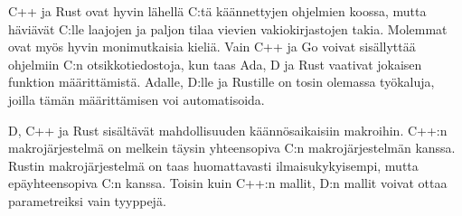 C++ ja Rust ovat hyvin lähellä C:tä käännettyjen ohjelmien koossa, mutta
häviävät C:lle laajojen ja paljon tilaa vievien vakiokirjastojen takia.
Molemmat ovat myös hyvin monimutkaisia kieliä. Vain C++ ja Go voivat
sisällyttää ohjelmiin C:n otsikkotiedostoja, kun taas Ada, D ja Rust vaativat
jokaisen funktion määrittämistä. Adalle, D:lle ja Rustille on tosin olemassa
työkaluja, joilla tämän määrittämisen voi automatisoida.

D, C++ ja Rust sisältävät mahdollisuuden käännösaikaisiin makroihin. C++:n
makrojärjestelmä on melkein täysin yhteensopiva C:n makrojärjestelmän kanssa.
Rustin makrojärjestelmä on taas huomattavasti ilmaisukykyisempi, mutta
epäyhteensopiva C:n kanssa. Toisin kuin C++:n mallit, D:n mallit voivat ottaa
parametreiksi vain tyyppejä.

\newpage

